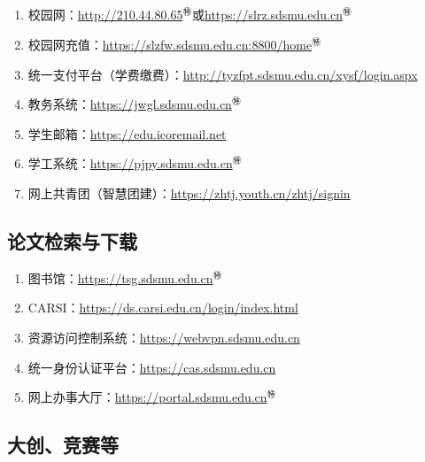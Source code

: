 \subsection[日常使用]{\textbf{}}
\begin{enumerate}
    \item 校园网：\href{http://210.44.80.65}{http://210.44.80.65$^㊕$}或\href{https://slrz.sdsmu.edu.cn}{https://slrz.sdsmu.edu.cn$^㊕$}
    \item 校园网充值：\href{https://slzfw.sdsmu.edu.cn:8800/home}{https://slzfw.sdsmu.edu.cn:8800/home$^㊕$}
    \item 统一支付平台（学费缴费）：\href{http://tyzfpt.sdsmu.edu.cn/xysf/login.aspx}{http://tyzfpt.sdsmu.edu.cn/xysf/login.aspx}
    \item 教务系统：\href{https://jwgl.sdsmu.edu.cn}{https://jwgl.sdsmu.edu.cn$^㊕$}
    \item 学生邮箱：\href{https://edu.icoremail.net}{https://edu.icoremail.net}
    \item 学工系统：\href{https://pjpy.sdsmu.edu.cn}{https://pjpy.sdsmu.edu.cn$^㊕$}
    \item 网上共青团（智慧团建）：\href{https://zhtj.youth.cn/zhtj/signin}{https://zhtj.youth.cn/zhtj/signin}
\end{enumerate}

\subsection[论文检索与下载]{论文检索与下载}
\begin{enumerate}
    \item 图书馆：\href{https://tsg.sdsmu.edu.cn}{https://tsg.sdsmu.edu.cn$^㊕$}
    \item CARSI：\href{https://ds.carsi.edu.cn/login/index.html}{https://ds.carsi.edu.cn/login/index.html}
    \item 资源访问控制系统：\href{https://webvpn.sdsmu.edu.cn}{https://webvpn.sdsmu.edu.cn}
    \item 统一身份认证平台：\href{https://cas.sdsmu.edu.cn}{https://cas.sdsmu.edu.cn}
    \item 网上办事大厅：\href{https://portal.sdsmu.edu.cn}{https://portal.sdsmu.edu.cn$^㊕$}
\end{enumerate}

\subsection[大创、竞赛等]{大创、竞赛等\footnotemark}
